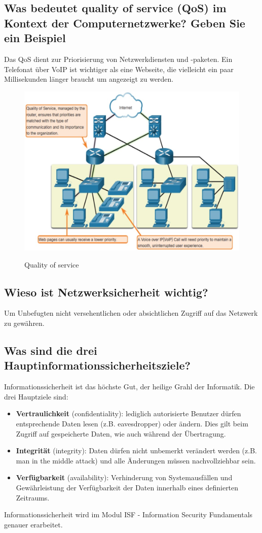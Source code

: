 \subsection*{Was bedeutet \flqq quality of service (QoS)\frqq{} im Kontext der Computernetzwerke? Geben Sie ein Beispiel}
Das QoS dient zur Priorisierung von Netzwerkdiensten und -paketen. Ein Telefonat über VoIP ist wichtiger als eine Webseite, die vielleicht ein paar Millisekunden länger braucht um angezeigt zu werden.
\begin{figure}[H]
    \begin{center}
    \label{pic:qos}
    \includegraphics[width=\textwidth]{images/qos.jpg}
    \caption{Quality of service}
    \end{center}
\end{figure}
\subsection*{Wieso ist Netzwerksicherheit wichtig?}
Um Unbefugten nicht versehentlichen oder absichtlichen Zugriff auf das Netzwerk zu gewähren.
\subsection*{Was sind die drei Hauptinformationssicherheitsziele?}
Informationssicherheit ist das höchste Gut, der heilige Grahl der Informatik. Die drei Hauptziele sind:
\begin{itemize}
    \item \textbf{Vertraulichkeit} (confidentiality): lediglich autorisierte Benutzer dürfen entsprechende Daten lesen (z.B. eavesdropper) oder ändern. Dies gilt beim Zugriff auf gespeicherte Daten, wie auch während der Übertragung.
    \item \textbf{Integrität} (integrity): Daten dürfen nicht unbemerkt verändert werden (z.B. man in the middle attack) und alle Änderungen müssen nachvollziehbar sein.
    \item \textbf{Verfügbarkeit} (availability): Verhinderung von Systemausfällen und Gewährleistung der Verfügbarkeit der Daten innerhalb eines definierten Zeitraums.
\end{itemize}
Informationssicherheit wird im Modul ISF - Information Security Fundamentals genauer erarbeitet.
